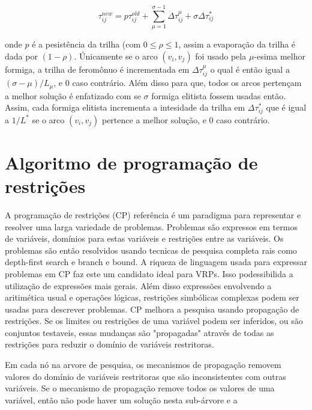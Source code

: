 \documentclass[a4paper, 12pt]{article}
\begin{document}
\[\tau^{new}_{ij} = p \tau^{old}_{ij} + \sum_{\mu=1}^{\sigma-1} \Delta\tau^{\mu}_{ij}+\sigma
\Delta\tau^{*}_{ij}\]

 onde $p$ é a pesistência da trilha (com $0 \leq \rho \leq 1$, assim a evaporação da trilha é dada
por $(1-\rho)$. Únicamente se o arco $(v_i, v_j)$ foi usado pela $\mu$-esima melhor formiga, a
trilha de feromônuo é incrementada em $\Delta \tau_{ij}^\mu$ o qual é então igual a $(\sigma -
\mu)/L_\mu$, e $0$ caso contrário. Além disso para que, todos os arcos pertençam a melhor solução
é enfatizado com se $\sigma$ formiga elitista fossem usadas então. Assim, cada formiga elitista
incrementa a intesidade da trilha em $\Delta \tau_{ij}^*$ que é igual a $1/L^*$ se o arco $(v_i,
v_j)$ pertence a melhor solução, e $0$ caso contrário.


\section{Algoritmo de programação de restrições}

 A programação de restrições (CP) {\color{red} referência} é um paradigma para representar e
resolver uma larga variedade de problemas. Problemas são expressos em termos de variáveis, domínios
para estas variáveis e restrições entre as variáveis. Os problemas são então resolvidos usando
tecnicas de pesquisa completa rais como depth-first search e branch e bound. A riqueza de linguagem
usada para expressar problemas em CP faz este um candidato ideal para VRPs. Isso podessibilida a
utilização de expressões mais gerais. Além disso expressões envolvendo a aritimética usual e
operações lógicas, restrições simbólicas complexas podem ser usadas para descrever problemas. CP
melhora a pesquisa usando propagação de restrições. Se os limites ou restrições de uma variável
podem ser inferidos, ou são conjuntos testaveis, essas mudanças são "propagadas" através de todas as
restrições para reduzir o domínio de variáveis restritoras.

 Em cada nó na arvore de pesquisa, os mecanismos de propagação removem valores do domínio de
variáveis restritoras que são inconsistentes com outras variáveis. Se o mecanismo de propagação
remove todos os valores de uma variável, então não pode haver um solução nesta sub-árvore e a 
\end{document}
